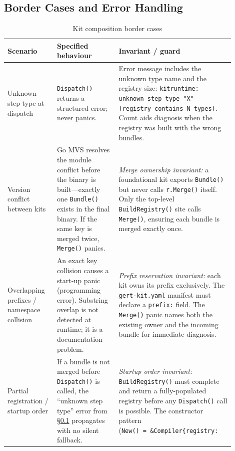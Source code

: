 \subsection{Border Cases and Error Handling}
\label{subsec:kit-border-cases}

\begin{table}[ht]
\centering
\caption{Kit composition border cases}
\label{tab:kit-border-cases}
\small
\begin{tabular}{p{0.20\linewidth}p{0.25\linewidth}p{0.45\linewidth}}
\toprule
\textbf{Scenario} & \textbf{Specified behaviour} & \textbf{Invariant / guard} \\
\midrule
Unknown step type at dispatch &
  \texttt{Dispatch()} returns a structured error; never panics. &
  Error message includes the unknown type name and the registry size:
  \texttt{kitruntime: unknown step type "X" (registry contains N types)}.
  Count aids diagnosis when the registry was built with the wrong bundles. \\
\midrule
Version conflict between kits &
  Go MVS resolves the module conflict before the binary is built---exactly
  one \texttt{Bundle()} exists in the final binary.  If the same key is merged
  twice, \texttt{Merge()} panics. &
  \textit{Merge ownership invariant:} a foundational kit exports
  \texttt{Bundle()} but never calls \texttt{r.Merge()} itself.  Only the
  top-level \texttt{BuildRegistry()} site calls \texttt{Merge()}, ensuring
  each bundle is merged exactly once. \\
\midrule
Overlapping prefixes / namespace collision &
  An exact key collision causes a start-up panic (programming error).
  Substring overlap is not detected at runtime; it is a documentation problem. &
  \textit{Prefix reservation invariant:} each kit owns its prefix exclusively.
  The \texttt{gert-kit.yaml} manifest must declare a \texttt{prefix:} field.
  The \texttt{Merge()} panic names both the existing owner and the incoming
  bundle for immediate diagnosis. \\
\midrule
Partial registration / startup order &
  If a bundle is not merged before \texttt{Dispatch()} is called, the
  ``unknown step type'' error from \S\ref{subsec:kit-border-cases} propagates
  with no silent fallback. &
  \textit{Startup order invariant:} \texttt{BuildRegistry()} must complete and
  return a fully-populated registry before any \texttt{Dispatch()} call is
  possible.  The constructor pattern (\texttt{New()~=~\&Compiler\{registry:
}
\end{tabular}
\end{table}
